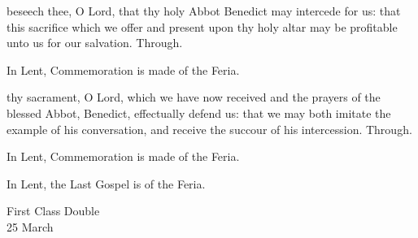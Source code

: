 \secret
{} beseech thee, O Lord, that thy holy Abbot Benedict may intercede for us: that this sacrifice which we offer and present upon thy holy altar may be profitable unto us for our salvation. Through.
\begin{rubric}
    In Lent, Commemoration is made of the Feria.
\end{rubric}
\postcommunion
{} thy sacrament, O Lord, which we have now received and the prayers of the blessed Abbot, Benedict, effectually defend us: that we may both imitate the example of his conversation, and receive the succour of his intercession. Through.
\begin{rubric}
    In Lent, Commemoration is made of the Feria.
\end{rubric}
\begin{rubric}
    In Lent, the Last Gospel is of the Feria.
\end{rubric}

\begin{inhead}
    {First Class Double\\
25 March}
\end{inhead}


